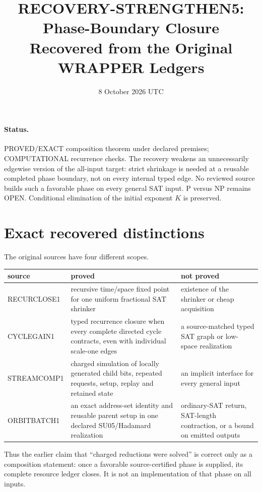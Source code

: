 \documentclass[11pt]{article}
\title{RECOVERY-STRENGTHEN5: Phase-Boundary Closure Recovered from the Original WRAPPER Ledgers}
\date{8 October 2026 UTC}
\begin{document}
\sloppy\maketitle

\paragraph{Status.}
PROVED/EXACT composition theorem under declared premises; COMPUTATIONAL
recurrence checks.  The recovery weakens an unnecessarily edgewise version
of the all-input target: strict shrinkage is needed at a reusable completed
phase boundary, not on every internal typed edge.  No reviewed source builds
such a favorable phase on every general SAT input.  P versus NP remains
OPEN.  Conditional elimination of the initial exponent $K$ is preserved.

\section{Exact recovered distinctions}
The original sources have four different scopes.
\begin{center}
\begin{tabular}{p{.19\linewidth}p{.34\linewidth}p{.37\linewidth}}
\toprule
source & proved & not proved\\
\midrule
RECURCLOSE1 & recursive time/space fixed point for one uniform fractional SAT shrinker & existence of the shrinker or cheap acquisition\\
CYCLEGAIN1 & typed recurrence closure when every complete directed cycle contracts, even with individual scale-one edges & a source-matched typed SAT graph or low-space realization\\
STREAMCOMP1 & charged simulation of locally generated child bits, repeated requests, setup, replay and retained state & an implicit interface for every general input\\
ORBITBATCH1 & an exact address-set identity and reusable parent setup in one declared SU05/Hadamard realization & ordinary-SAT return, SAT-length contraction, or a bound on emitted outputs\\
\bottomrule
\end{tabular}
\end{center}
Thus the earlier claim that ``charged reductions were solved'' is correct
only as a composition statement: once a favorable source-certified phase is
supplied, its complete resource ledger closes.  It is not an implementation
of that phase on all inputs.
\end{document}
